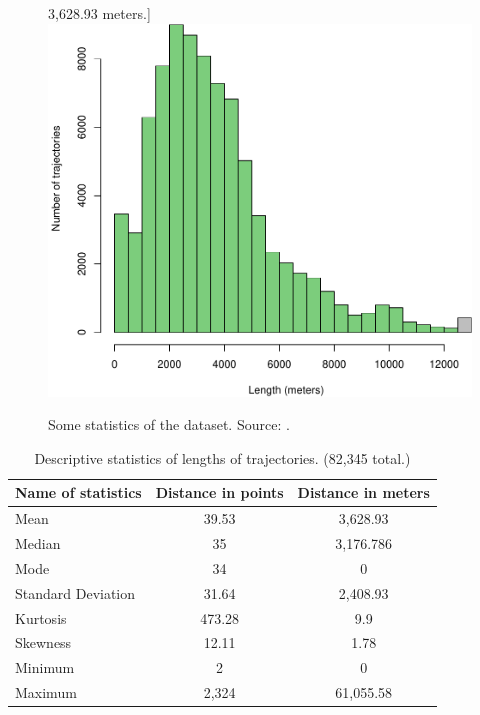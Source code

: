 \documentclass[b5paper,12pt]{report}
\theoremstyle{definition}
\begin{document}
\begin{figure}[h!]
\begin{minipage}{.495\linewidth}
3,628.93 meters.\label{pkdd15_trajectory_length}]{\includegraphics[width = .9\textwidth]{img/pkdd15_trajectory_length.pdf}}
\end{minipage}
\centering
\caption{Some statistics of the dataset. Source: \cite{traffic-paper}.}\label{desc-stat_dataset-1} 
\end{figure}

\begin{table}[t!]
\centering
\caption{Descriptive statistics of lengths of trajectories. (82,345 total.)}
\label{trajectory-lenght-stat} 
\begin{tabular}{l|c c}
Name of statistics  & Distance in points & Distance in meters \\ \hline
Mean                & 39.53     & 3,628.93    \\ 
Median              & 35     & 3,176.786   \\ 
Mode                & 34     & 0         \\ 
Standard Deviation  & 31.64  & 2,408.93  \\ 
Kurtosis            & 473.28 & 9.9  \\ 
Skewness            & 12.11   & 1.78  \\ 
Minimum             & 2      & 0         \\ 
Maximum             & 2,324   & 61,055.58  \\ 
\end{tabular}
\label{desc-stat-table}
\end{table}
\end{document}
